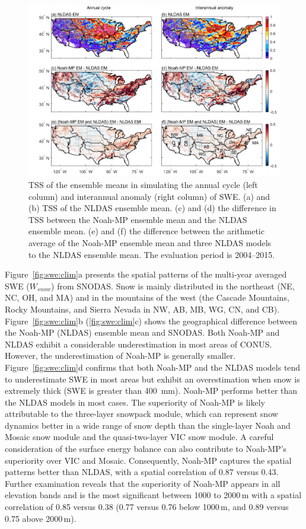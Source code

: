 \documentclass[essd, manuscript]{copernicus}
\begin{document}
\begin{figure}[t]
  \includegraphics[width=17cm]{fig/fig09.pdf}
  \caption{TSS of the ensemble means in simulating the annual cycle (left column) and interannual anomaly (right column) of SWE\@. (a) and (b) TSS of the NLDAS ensemble mean. (c) and (d) the difference in TSS between the Noah-MP ensemble mean and the NLDAS ensemble mean. (e) and (f) the difference between the arithmetic average of the Noah-MP ensemble mean and three NLDAS models to the NLDAS ensemble mean. The evaluation period is 2004--2015.}
  \label{fig:swe:tss}
\end{figure}

Figure~\ref{fig:swe:clim}a presents the spatial patterns of the multi-year averaged SWE (\(W_{snow}\)) from SNODAS\@. Snow is mainly distributed in the northeast (NE, NC, OH, and MA) and in the mountains of the west (the Cascade Mountains, Rocky Mountains, and Sierra Nevada in NW, AB, MB, WG, CN, and CB). Figure~\ref{fig:swe:clim}b (\ref{fig:swe:clim}c) shows the geographical difference between the Noah-MP (NLDAS) ensemble mean and SNODAS\@. Both Noah-MP and NLDAS exhibit a considerable underestimation in most areas of CONUS\@. However, the underestimation of Noah-MP is generally smaller. Figure~\ref{fig:swe:clim}d confirms that both Noah-MP and the NLDAS models tend to underestimate SWE in most areas but exhibit an overestimation when snow is extremely thick (SWE is greater than \qty{400}{mm}). Noah-MP performs better than the NLDAS models in most cases. The superiority of Noah-MP is likely attributable to the three-layer snowpack module, which can represent snow dynamics better in a wide range of snow depth than the single-layer Noah and Mosaic snow module and the quasi-two-layer VIC snow module. A careful consideration of the surface energy balance can also contribute to Noah-MP's superiority over VIC and Mosaic. Consequently, Noah-MP captures the spatial patterns better than NLDAS, with a spatial correlation of 0.87 versus 0.43. Further examination reveals that the superiority of Noah-MP appears in all elevation bands and is the most significant between 1000 to 2000\,m with a spatial correlation of 0.85 versus 0.38 (0.77 versus 0.76 below 1000\,m, and 0.89 versus 0.75 above 2000\,m).
\end{document}
